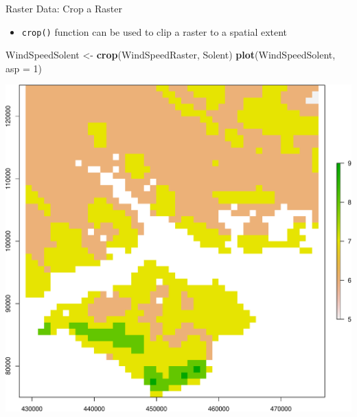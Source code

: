 \documentclass[10pt,ignorenonframetext,]{beamer}
\newenvironment{Shaded}{\begin{snugshade}}{\end{snugshade}}
\newcommand{\KeywordTok}[1]{\textcolor[rgb]{0.13,0.29,0.53}{\textbf{{#1}}}}
\newcommand{\DataTypeTok}[1]{\textcolor[rgb]{0.13,0.29,0.53}{{#1}}}
\newcommand{\DecValTok}[1]{\textcolor[rgb]{0.00,0.00,0.81}{{#1}}}
\newcommand{\StringTok}[1]{\textcolor[rgb]{0.31,0.60,0.02}{{#1}}}
\newcommand{\NormalTok}[1]{{#1}}
\providecommand{\tightlist}{%
  \setlength{\itemsep}{0pt}\setlength{\parskip}{0pt}}
\begin{document}
\begin{frame}[fragile]{Raster Data: Crop a Raster}

\begin{itemize}
\tightlist
\item
  \texttt{crop()} function can be used to clip a raster to a spatial
  extent
\end{itemize}

\begin{Shaded}
\begin{Highlighting}[]
\NormalTok{WindSpeedSolent <-}\StringTok{ }\KeywordTok{crop}\NormalTok{(WindSpeedRaster, Solent)}
\KeywordTok{plot}\NormalTok{(WindSpeedSolent, }\DataTypeTok{asp =} \DecValTok{1}\NormalTok{)}
\end{Highlighting}
\end{Shaded}

\begin{center}\includegraphics[width=0.45\linewidth]{SpatialDataLecture_files/figure-beamer/crop_peru_rast-1} \end{center}

\end{frame}
\end{document}

